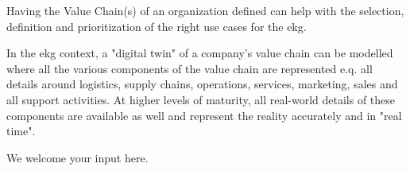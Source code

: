 %
%

\ekgmmContextSection

\ekgmmHowEKGRequiresThisCapability

Having the Value Chain(s) of an organization defined can help with the selection, definition and prioritization of
the right use cases for the \gls{ekg}.

\ekgmmHowEKGAffectsThisCapability

In the \gls{ekg} context, a "digital twin" of a company's value chain can be modelled where all the various components
of the value chain are represented e.q. all details around logistics, supply chains, operations, services, marketing,
sales and all support activities.
At higher levels of maturity, all real-world details of these components are available as well and represent
the reality accurately and in "real time".

We welcome your input here.

